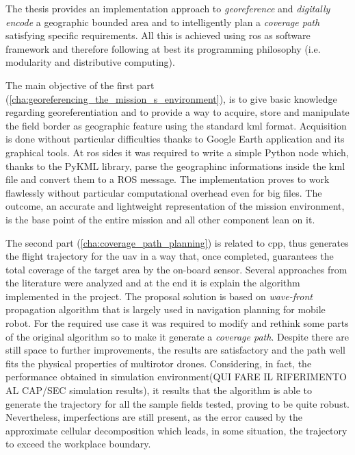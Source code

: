 The thesis provides  an implementation approach to \textit{georeference} and \textit{digitally encode} a geographic bounded area and to intelligently plan a \textit{coverage path} satisfying specific requirements. All this is achieved using \acrshort{ros} as software framework and therefore following at best its programming philosophy (i.e. modularity and distributive computing).\par
The main objective of the first part (\autoref{cha:georeferencing_the_mission_s_environment}), is to give basic knowledge regarding georeferentiation and to provide a way to acquire, store and manipulate the field border as geographic feature using the standard \acrfull{kml} format. Acquisition is done without particular difficulties thanks to Google Earth application and its graphical tools. At \acrshort{ros} sides it was required to write a simple Python node which, thanks to the \textsf{PyKML library}, parse the geographinc informations inside the \acrshort{kml} file and convert them to a ROS message. The implementation proves to work flawlessly without particular computational overhead even for big files. The outcome, an accurate and lightweight representation of the mission environment, is the base point of the entire mission and all other component lean on it.\par
The second part (\autoref{cha:coverage_path_planning}) is related to \acrfull{cpp}, thus generates the flight trajectory for the \acrshort{uav} in a way that, once completed, guarantees the total coverage of the target area by the on-board sensor. Several approaches from the literature were analyzed and at the end it is explain the algorithm implemented in the project. The proposal solution is based on \textit{wave-front} propagation algorithm that is largely used in navigation planning for mobile robot. For the required use case it was required to modify and rethink some parts of the original algorithm so to make it generate a \textit{coverage path}. Despite there are still space to further improvements, the results are satisfactory and the path well fits the physical properties of multirotor drones. Considering, in fact, the performance obtained in simulation environment(QUI FARE IL RIFERIMENTO AL CAP/SEC simulation results), it results that the algorithm is able to generate the trajectory for all the sample fields tested, proving to be quite robust.\\
Nevertheless, imperfections are still present, as the error caused by the approximate cellular decomposition which leads, in some situation, the trajectory to exceed the workplace boundary.
